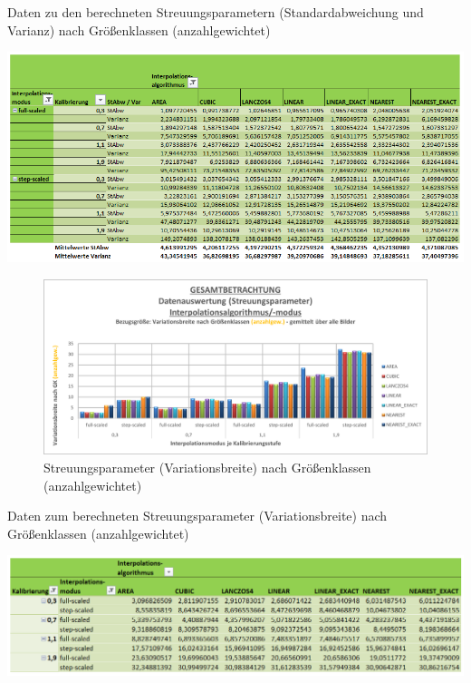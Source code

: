 \documentclass[
fontsize=10pt, 
listof = totoc,
parskip = half	
]{report}
\begin{document}
\begin{table}[H]
	\centering
	\caption{Daten zu den berechneten Streuungsparametern (Standardabweichung und Varianz) nach Größenklassen (anzahlgewichtet)}
	\label{tab:DAGesamtStreu1GKanzahl}
	\includegraphics[width=\textwidth, height=\textheight, keepaspectratio]{pics/Tab_DA_Gesamt_Streu1_GKanzahl}
\end{table} 

\begin{figure}[H]
	\centering
	\includegraphics[width=\textwidth, height=\textheight, keepaspectratio]{pics/DA_Gesamt_Streu2_GKanzahl}
	\caption{Streuungsparameter (Variationsbreite) nach Größenklassen (anzahlgewichtet)}
	\label{fig:DAGesamtStreu2GKanzahl}
\end{figure}

\begin{table}[H]
	\centering
	\caption{Daten zum berechneten Streuungsparameter (Variationsbreite) nach Größenklassen (anzahlgewichtet)}
	\label{tab:DAGesamtStreu2GKanzahl}
	\includegraphics[width=\textwidth, height=\textheight, keepaspectratio]{pics/Tab_DA_Gesamt_Streu2_GKanzahl}
\end{table}
\end{document}

